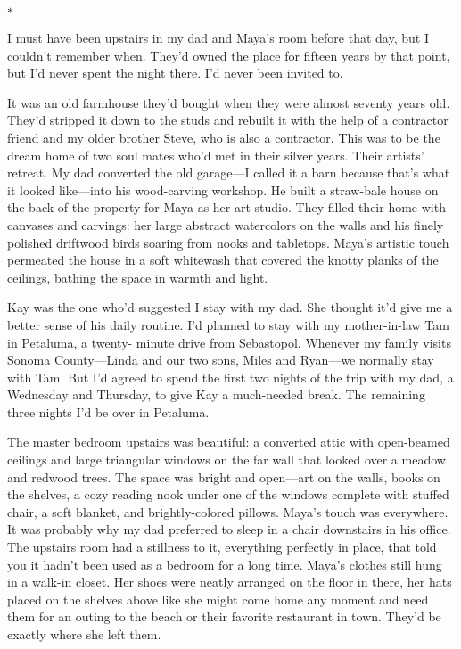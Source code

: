 \documentclass[12pt]{book}
\begin{document}
\begin{center}$*$\end{center}

I must have been upstairs in my dad and Maya's room before that day, but I couldn't remember when. They'd owned the place for fifteen years by that point, but I'd never spent the night there. I'd never been invited to.

It was an old farmhouse they'd bought when they were almost seventy years old. They'd stripped it down to the studs and rebuilt it with the help of a contractor friend and my older brother Steve, who is also a contractor. This was to be the dream home of two soul mates who'd met in their silver years. Their artists' retreat. My dad converted the old garage---I called it a barn because that's what it looked like---into his wood-carving workshop. He built a straw-bale house on the back of the property for Maya as her art studio. They filled their home with canvases and carvings: her large abstract watercolors on the walls and his finely polished driftwood birds soaring from nooks and tabletops. Maya's artistic touch permeated the house in a soft whitewash that covered the knotty planks of the ceilings, bathing the space in warmth and light.

Kay was the one who'd suggested I stay with my dad. She thought it'd give me a better sense of his daily routine. I'd planned to stay with my mother-in-law Tam in Petaluma, a twenty- minute drive from Sebastopol. Whenever my family visits Sonoma County---Linda and our two sons, Miles and Ryan---we normally stay with Tam. But I'd agreed to spend the first two nights of the trip with my dad, a Wednesday and Thursday, to give Kay a much-needed break. The remaining three nights I'd be over in Petaluma.

The master bedroom upstairs was beautiful: a converted attic with open-beamed ceilings and large triangular windows on the far wall that looked over a meadow and redwood trees. The space was bright and open---art on the walls, books on the shelves, a cozy reading nook under one of the windows complete with stuffed chair, a soft blanket, and brightly-colored pillows. Maya's touch was everywhere. It was probably why my dad preferred to sleep in a chair downstairs in his office. The upstairs room had a stillness to it, everything perfectly in place, that told you it hadn't been used as a bedroom for a long time. Maya's clothes still hung in a walk-in closet. Her shoes were neatly arranged on the floor in there, her hats placed on the shelves above like she might come home any moment and need them for an outing to the beach or their favorite restaurant in town. They'd be exactly where she left them.
\end{document}
